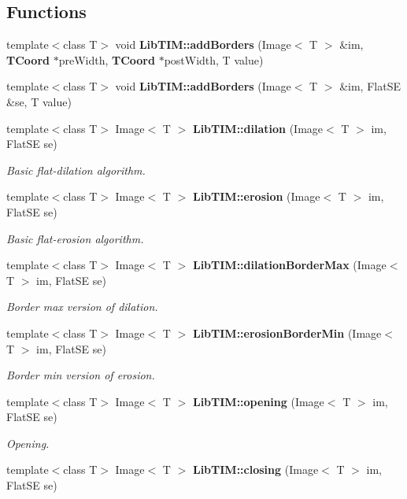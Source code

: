\subsection*{Functions}
\begin{CompactItemize}
\item 
template$<$class T$>$ void {\bf Lib\-TIM::add\-Borders} (Image$<$ T $>$ \&im, {\bf TCoord} $\ast$pre\-Width, {\bf TCoord} $\ast$post\-Width, T value)
\item 
template$<$class T$>$ void {\bf Lib\-TIM::add\-Borders} (Image$<$ T $>$ \&im, Flat\-SE \&se, T value)
\item 
template$<$class T$>$ Image$<$ T $>$ {\bf Lib\-TIM::dilation} (Image$<$ T $>$ im, Flat\-SE se)
\begin{CompactList}\small\item\em Basic flat-dilation algorithm. \item\end{CompactList}\item 
template$<$class T$>$ Image$<$ T $>$ {\bf Lib\-TIM::erosion} (Image$<$ T $>$ im, Flat\-SE se)
\begin{CompactList}\small\item\em Basic flat-erosion algorithm. \item\end{CompactList}\item 
template$<$class T$>$ Image$<$ T $>$ {\bf Lib\-TIM::dilation\-Border\-Max} (Image$<$ T $>$ im, Flat\-SE se)
\begin{CompactList}\small\item\em Border max version of dilation. \item\end{CompactList}\item 
template$<$class T$>$ Image$<$ T $>$ {\bf Lib\-TIM::erosion\-Border\-Min} (Image$<$ T $>$ im, Flat\-SE se)
\begin{CompactList}\small\item\em Border min version of erosion. \item\end{CompactList}\item 
template$<$class T$>$ Image$<$ T $>$ {\bf Lib\-TIM::opening} (Image$<$ T $>$ im, Flat\-SE se)
\begin{CompactList}\small\item\em Opening. \item\end{CompactList}\item 
template$<$class T$>$ Image$<$ T $>$ {\bf Lib\-TIM::closing} (Image$<$ T $>$ im, Flat\-SE se)

\end{CompactItemize}
